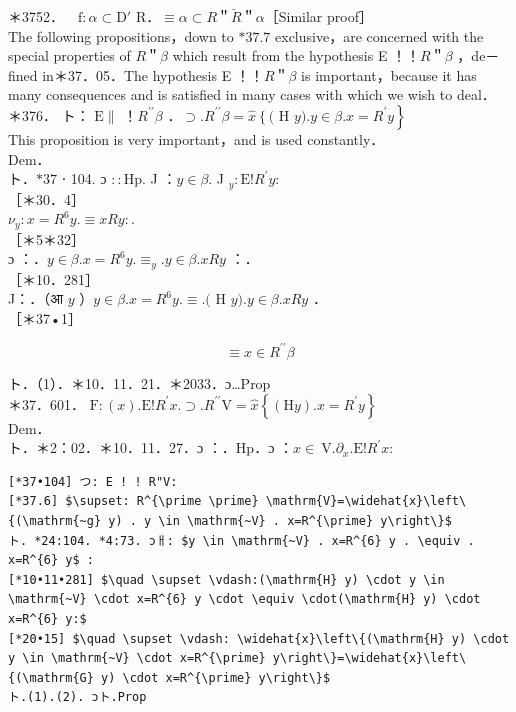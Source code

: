 \documentclass[10pt]{article}
\begin{document}
＊3752．$\quad \mathrm{f}: \alpha \subset \mathrm{D} \prime$ R．$\equiv \alpha \subset R$＂$\breve{R}$＂$\alpha$［Similar proof］\\
The following propositions，down to $* 37.7$ exclusive，are concerned with the special properties of $R$＂$\beta$ which result from the hypothesis E ！！$R$＂$\beta$ ，de－ fined in＊37．05．The hypothesis E ！！$R$＂$\beta$ is important，because it has many consequences and is satisfied in many cases with which we wish to deal．\\
＊376． ト： $\mathrm{E} \|$ ！$R^{\prime \prime} \beta$ ．$\supset . R^{\prime \prime} \beta=\widehat{x}\left\{(\right.$ H $\left.y) . y \in \beta . x=R^{\prime} y\right\}$\\
This proposition is very important，and is used constantly．\\
Dem．\\
ト．$* 37$ ⋅ 104. ɔ $:: \mathrm{Hp}$. J ：$y \in \beta$. J $_{y}: \mathrm{E}!R^{\prime} y:$\\
［＊30．4］\\
$\nu_{y}: x=R^{6} y . \equiv x R y:$.\\
［＊5＊32］\\
ɔ ：．$y \in \beta . x=R^{6} y . \equiv_{y} . y \in \beta . x R y$ ：．\\
［＊10．281］\\
J：．（आ $y$ ）$y \in \beta . x=R^{6} y . \equiv .($ H $y) . y \in \beta . x R y$ ．\\
［＊37•1］


\begin{equation*}
\equiv x \in R^{\prime \prime} \beta \tag{1}
\end{equation*}


ト．（1）．＊10．11．21．＊2033．ɔ…Prop\\
＊37．601． $\mathrm{F}:(x) . \mathrm{E}!R^{\prime} x . \supset . R^{\prime \prime} \mathrm{V}=\widehat{x}\left\{(\mathrm{H} y) . x=R^{\prime} y\right\}$\\
Dem．\\
ト．＊2：02．＊10．11．27．ɔ ：．Hp．ɔ ：$x \in \mathrm{~V} . \partial_{x} . \mathrm{E}!R^{\prime} x:$

\begin{verbatim}
[*37•104] つ: E ! ! R"V:
[*37.6] $\supset: R^{\prime \prime} \mathrm{V}=\widehat{x}\left\{(\mathrm{~g} y) . y \in \mathrm{~V} . x=R^{\prime} y\right\}$
ト. *24:104. *4:73. ɔㅐ: $y \in \mathrm{~V} . x=R^{6} y . \equiv . x=R^{6} y$ :
[*10•11•281] $\quad \supset \vdash:(\mathrm{H} y) \cdot y \in \mathrm{~V} \cdot x=R^{6} y \cdot \equiv \cdot(\mathrm{H} y) \cdot x=R^{6} y:$
[*20•15] $\quad \supset \vdash: \widehat{x}\left\{(\mathrm{H} y) \cdot y \in \mathrm{~V} \cdot x=R^{\prime} y\right\}=\widehat{x}\left\{(\mathrm{G} y) \cdot x=R^{\prime} y\right\}$
ト.(1).(2). ɔト.Prop
\end{verbatim}
\end{document}
